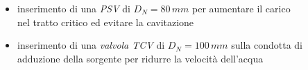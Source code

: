 \documentclass{beamer}
\begin{document}
\begin{frame}
\begin{columns}
\begin{column}{.5\textwidth}
\begin{figure}
\begin{overprint}
	   \vspace{.5mm}
	   \begin{center}
	   \end{center}
	  \end{overprint}
	  \end{figure}
	 \end{column}
%
	\begin{column}{.5\textwidth}
		\begin{itemize}[<+->]
		\onslide<1>\item inserimento di una \emph{PSV} di $D_N = 80\,mm$ per aumentare il carico nel tratto critico ed evitare la cavitazione	
		 \onslide<2>\item inserimento di una \emph{valvola TCV} di $D_N = 100\,mm$ sulla condotta di adduzione della sorgente per ridurre la velocità dell'acqua
		\end{itemize}
	\end{column}
 \end{columns}
\end{frame}
\end{document}
